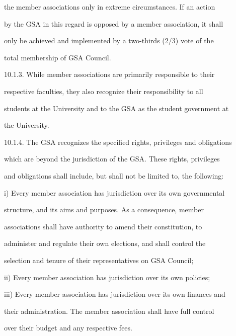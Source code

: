        the  member  associations  only  in  extreme  circumstances.  If  an  action  

        by the GSA in this regard is opposed by a member association, it shall  

        only  be  achieved  and  implemented  by  a  two-thirds  (2/3)  vote  of  the  

        total membership of GSA  Council.  



10.1.3.     While   member   associations   are   primarily   responsible   to   their  

        respective  faculties,  they  also  recognize  their  responsibility  to  all  

        students at the University and to the GSA as the student government at  

        the University.  



10.1.4.     The GSA recognizes the specified rights, privileges and obligations  

        which are beyond the jurisdiction of the GSA. These rights, privileges  

        and obligations shall include, but shall not be limited to, the following:  



i)      Every member association has jurisdiction over its own governmental  

        structure,  and  its  aims  and  purposes.  As  a  consequence,  member  

        associations   shall   have   authority   to   amend   their   constitution,   to  

        administer  and  regulate  their  own  elections,  and  shall  control  the  

        selection and tenure of their representatives on GSA Council;  



ii)     Every member association has jurisdiction over its own policies;  



iii)    Every  member association has jurisdiction over its own finances and  

        their  administration.  The  member  association  shall  have  full  control  

        over their budget and any respective fees.  



